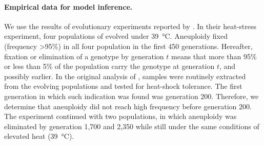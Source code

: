 \documentclass[12pt]{extarticle}
\begin{document}
\paragraph{Empirical data for model inference.}

We use the results of evolutionary experiments reported by \citet{Yona2012}.
In their heat-stress experiment, four populations of \yeast evolved under \SI{39}{\celsius}. 
Aneuploidy fixed (frequency >95\%) in all four population in the first 450 generations. 
Hereafter, fixation or elimination of a genotype by generation $t$ means that more than 95\% or less than 5\% of the population carry the genotype at generation $t$, and possibly earlier. 
In the original analysis of \citet{Yona2012}, samples were routinely extracted from the evolving populations and tested for heat-shock tolerance. The first generation in which such indication was found was generation 200. Therefore, we determine that aneuploidy did not reach high frequency before generation 200.
The experiment continued with two populations, in which aneuploidy was eliminated by generation 1,700 and 2,350 while still under the same conditions of elevated heat (\SI{39}{\celsius}).
\end{document}
